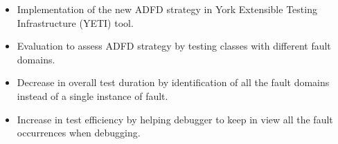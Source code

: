 \begin{itemize}
\item Implementation of the new ADFD strategy in York Extensible Testing Infrastructure (YETI) tool.
\item Evaluation to assess ADFD strategy by testing classes with different fault domains.
\item Decrease in overall test duration by identification of all the fault domains instead of a single instance of fault.
\item Increase in test efficiency by helping debugger to keep in view all the fault occurrences when debugging. 
\end{itemize}







